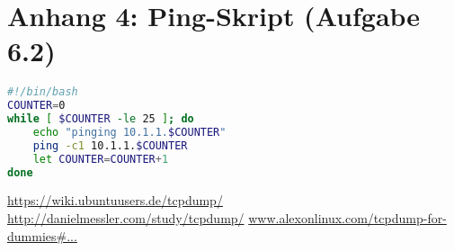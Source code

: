 \documentclass[twoside]{article}
\begin{document}
\section*{Anhang 4: Ping-Skript (Aufgabe 6.2)}
\begin{lstlisting}[language=Bash]
#!/bin/bash
COUNTER=0
while [ $COUNTER -le 25 ]; do
	echo "pinging 10.1.1.$COUNTER"
	ping -c1 10.1.1.$COUNTER
	let COUNTER=COUNTER+1
done
\end{lstlisting}

\begin{thebibliography}{1}
		\url{https://wiki.ubuntuusers.de/tcpdump/}
		\url{http://danielmessler.com/study/tcpdump/}
			\url{www.alexonlinux.com/tcpdump-for-dummies\#...}
\end{thebibliography}
\end{document}
